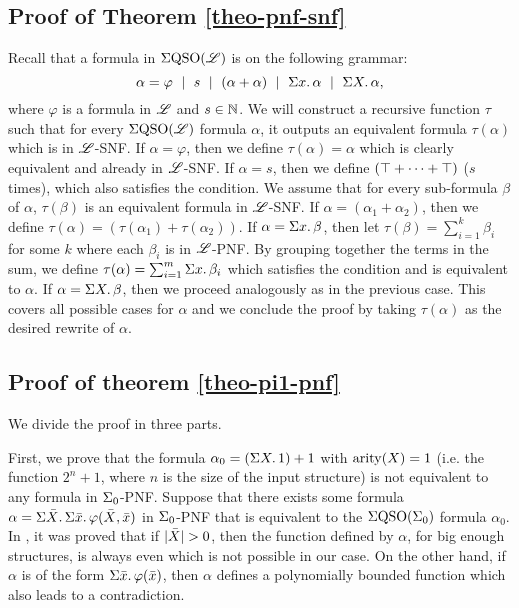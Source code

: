 \subsection*{Proof of Theorem \ref{theo-pnf-snf}}
Recall that a formula in $\Sigma{\rm QSO}(\mathscr{L})$ is on the following grammar:
$$
\alpha = \varphi \ \mid \ s \ \mid \ (\alpha + \alpha) \ \mid \ \sa{x} \alpha \ \mid \ \sa{X} \alpha,
$$
where $\varphi$ is a formula in $\mathscr{L}$ and $s\in\mathbb{N}$. We will construct a recursive function $\tau$ such that for every $\Sigma{\rm QSO}(\mathscr{L})$ formula $\alpha$, it outputs an equivalent formula $\tau(\alpha)$ which is in $\mathscr{L}$-SNF. If $\alpha = \varphi$, then we define $\tau(\alpha) = \alpha$ which is clearly equivalent and already in $\mathscr{L}$-SNF. If $\alpha = s$, then we define $(\top + \cdots + \top)$ ($s$ times), which also satisfies the condition. We assume that for every sub-formula $\beta$ of $\alpha$, $\tau(\beta)$ is an equivalent formula in $\mathscr{L}$-SNF. If $\alpha = (\alpha_1 + \alpha_2)$, then we define $\tau(\alpha) = (\tau(\alpha_1) + \tau(\alpha_2))$. If $\alpha = \Sigma{x}.\,\beta$, then let $\tau(\beta) = \sum_{i = 1}^{k}\beta_i$ for some $k$ where each $\beta_i$ is in $\mathscr{L}$-PNF. By grouping together the terms in the sum, we define $\tau(\alpha) = \sum_{i = 1}^{m}\Sigma{x}.\,\beta_i$ which satisfies the condition and is equivalent to $\alpha$. If $\alpha = \Sigma{X}.\,\beta$, then we proceed analogously as in the previous case. This covers all possible cases for $\alpha$ and we conclude the proof by taking $\tau(\alpha)$ as the desired rewrite of $\alpha$.












\subsection*{Proof of theorem \ref{theo-pi1-pnf}}
We divide the proof in three parts.

\vspace{1em}
First, we prove that the formula $\alpha_{0} = \left( \Sigma{X}.\, 1 \right) + 1$ with ${\rm arity}(X) = 1$ (i.e. the function $2^{n}+1$, where $n$ is the size of the input structure) is not equivalent to any formula in $\Sigma_{0}$-PNF. Suppose that there exists some formula $\alpha = \Sigma{\bar{X}}.\,\Sigma{\bar{x}}.\,\varphi(\bar{X},\bar{x})$ in $\Sigma_{0}$-PNF that is equivalent to the $\Sigma{\rm QSO}(\Sigma_{0})$ formula $\alpha_0$.
In \cite{SalujaST95}, it was proved that if $\vert \bar{X} \vert > 0$, then the function defined by $\alpha$, for big enough structures, is always even which is not possible in our case.
On the other hand, if $\alpha$ is of the form $\Sigma{\bar{x}}.\,\varphi(\bar{x})$, then $\alpha$ defines a polynomially bounded function which also leads to a contradiction.

